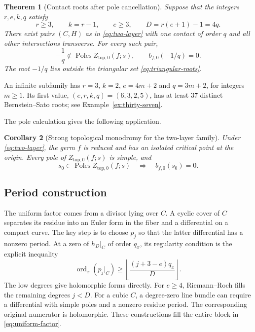 \documentclass[11pt]{article}
\numberwithin{equation}{section}
\newtheorem{theorem}{Theorem}[section]
\newtheorem{corollary}[theorem]{Corollary}
\theoremstyle{definition}
\theoremstyle{remark}
\newcommand{\bfzero}{b_{f,0}}
\DeclareMathOperator{\ord}{ord}
\DeclareMathOperator{\Poles}{Poles}
\begin{document}
\begin{theorem}[Contact roots after pole cancellation]
\label{thm:cancelled}
Suppose that the integers $r,e,k,q$ satisfy
\begin{equation}\label{eq:cancelled-family}
 r\ge3,\qquad k=r-1,\qquad e\ge3,\qquad
 D=r(e+1)-1=4q.
\end{equation}
There exist pairs $(C,H)$ as in \eqref{eq:two-layer} with one
contact of order $q$ and all other intersections transverse.
For every such pair,
\begin{equation}\label{eq:cancelled-conclusion}
 -\frac1q\notin\Poles Z_{\mathrm{top},0}(f;s),\qquad
 \bfzero(-1/q)=0.
\end{equation}
The root $-1/q$ lies outside the triangular set
\eqref{eq:triangular-roots}.
\end{theorem}

An infinite subfamily has $r=3$, $k=2$, $e=4m+2$ and
$q=3m+2$, for integers $m\ge1$. Its first value,
$(e,r,k,q)=(6,3,2,5)$, has at least $37$ distinct
Bernstein--Sato roots; see Example~\ref{ex:thirty-seven}.

The pole calculation gives the following application.

\begin{corollary}[Strong topological monodromy for the two-layer family]
\label{cor:strong}
Under \eqref{eq:two-layer}, the germ $f$ is reduced and has an
isolated critical point at the origin. Every pole of
$Z_{\mathrm{top},0}(f;s)$ is simple, and
\begin{equation}\label{eq:strong}
 s_0\in\Poles Z_{\mathrm{top},0}(f;s)
 \quad\Longrightarrow\quad \bfzero(s_0)=0.
\end{equation}
\end{corollary}

\subsection*{Period construction}

The uniform factor comes from a divisor lying over $C$. A cyclic
cover of $C$ separates its residue into an Euler form in the
fiber and a differential on a compact curve. The key step is to
choose $p_j$ so that the latter differential has a nonzero
period. At a zero of $h_D|_C$ of order $q_x$, its regularity
condition is
the explicit inequality
\[
 \ord_x(p_j|_C)\ge
 \left\lfloor\frac{(j+3-e)q_x}{D}\right\rfloor.
\]
The low degrees give holomorphic forms directly. For
$e\ge4$, Riemann--Roch fills the remaining degrees $j<D$.
For a cubic $C$, a degree-zero line bundle can require a
differential with simple poles and a nonzero residue period.
The corresponding original numerator is holomorphic.
These constructions fill the entire block in
\eqref{eq:uniform-factor}.
\end{document}
